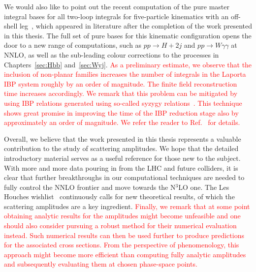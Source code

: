 \documentclass[main.tex]{subfiles}
\begin{document}
\begin{enumerate}
We would also like to point out the recent computation of the pure master integral bases for all two-loop integrals for five-particle kinematics with an off-shell leg~\cite{Abreu:2023rco}, which appeared in literature after the completion of the work presented in this thesis. The full set of pure bases for this kinematic configuration opens the door to a new range of computations, such as $pp \rightarrow H+2j$ and $pp \rightarrow W \gamma \gamma $ at NNLO, as well as the sub-leading colour corrections to the processes in Chapters~\ref{sec:Hbb} and~\ref{sec:Wyj}. \textcolor{red}{As a preliminary estimate, we observe that the inclusion of non-planar families increases the number of integrals in the Laporta IBP system roughly by an order of magnitude. The finite field reconstruction time increases accordingly. We remark that this problem can be mitigated by using IBP relations generated using so-called syzygy relations~\cite{Gluza:2010ws, 10.1145/1993886.1993902, Schabinger:2011dz, Chen:2015lyz, Bohm:2017qme, Bosma:2018mtf, Boehm:2020zig}. This technique shows great promise in improving the time of the IBP reduction stage also by approximately an order of magnitude. We refer the reader to Ref.~\cite{Wu:2023upw} for details.}

Overall, we believe that the work presented in this thesis represents a valuable contribution to the study of scattering amplitudes. We hope that the detailed introductory material serves as a useful reference for those new to the subject. With more and more data pouring in from the LHC and future colliders, it is clear that further breakthroughs in our computational techniques are needed to fully control the NNLO frontier and move towards the N$^3$LO one. The Les Houches wishlist~\cite{Huss:2022ful} continuously calls for new theoretical results, of which the scattering amplitudes are a key ingredient. \textcolor{red}{Finally, we remark that at some point obtaining analytic results for the amplitudes might become unfeasible and one should also consider pursuing a robust method for their numerical evaluation instead. Such numerical results can then be used further to produce predictions for the associated cross sections. From the perspective of phenomenology, this approach might become more efficient than computing fully analytic amplitudes and subsequently evaluating them at chosen phase-space points.}




\end{enumerate}
\end{document}
